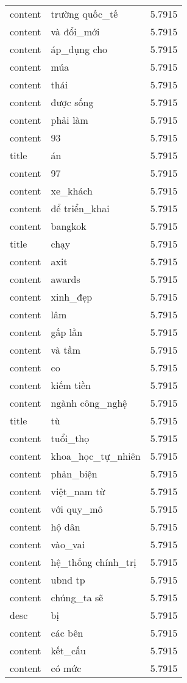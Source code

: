 \documentclass{article}
\begin{document}
\begin{tabular}{lll}
content & trường quốc\_tế & 5.7915\\
content & và đổi\_mới & 5.7915\\
content & áp\_dụng cho & 5.7915\\
content & múa & 5.7915\\
content & thái & 5.7915\\
content & được sống & 5.7915\\
content & phải làm & 5.7915\\
content & 93 & 5.7915\\
title & án & 5.7915\\
content & 97 & 5.7915\\
content & xe\_khách & 5.7915\\
content & để triển\_khai & 5.7915\\
content & bangkok & 5.7915\\
title & chạy & 5.7915\\
content & axit & 5.7915\\
content & awards & 5.7915\\
content & xinh\_đẹp & 5.7915\\
content & lâm & 5.7915\\
content & gấp lần & 5.7915\\
content & và tầm & 5.7915\\
content & co & 5.7915\\
content & kiếm tiền & 5.7915\\
content & ngành công\_nghệ & 5.7915\\
title & tù & 5.7915\\
content & tuổi\_thọ & 5.7915\\
content & khoa\_học\_tự\_nhiên & 5.7915\\
content & phản\_biện & 5.7915\\
content & việt\_nam từ & 5.7915\\
content & với quy\_mô & 5.7915\\
content & hộ dân & 5.7915\\
content & vào\_vai & 5.7915\\
content & hệ\_thống chính\_trị & 5.7915\\
content & ubnd tp & 5.7915\\
content & chúng\_ta sẽ & 5.7915\\
desc & bị & 5.7915\\
content & các bên & 5.7915\\
content & kết\_cấu & 5.7915\\
content & có mức & 5.7915\\

\end{tabular}
\end{document}
